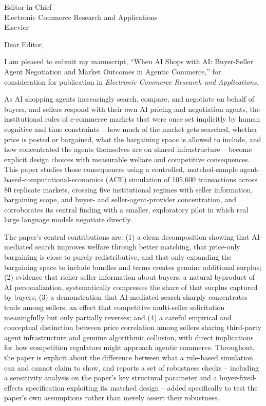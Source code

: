 \documentclass[12pt]{letter}
\begin{document}
\begin{letter}{Editor-in-Chief \\ Electronic Commerce Research and Applications \\ Elsevier}

\opening{Dear Editor,}

I am pleased to submit my manuscript, ``When AI Shops with AI: Buyer-Seller Agent Negotiation and Market Outcomes in Agentic Commerce,'' for consideration for publication in \emph{Electronic Commerce Research and Applications}.

As AI shopping agents increasingly search, compare, and negotiate on behalf of buyers, and sellers respond with their own AI pricing and negotiation agents, the institutional rules of e-commerce markets that were once set implicitly by human cognitive and time constraints -- how much of the market gets searched, whether price is posted or bargained, what the bargaining space is allowed to include, and how concentrated the agents themselves are on shared infrastructure -- become explicit design choices with measurable welfare and competitive consequences. This paper studies those consequences using a controlled, matched-sample agent-based-computational-economics (ACE) simulation of 105,600 transactions across 80 replicate markets, crossing five institutional regimes with seller information, bargaining scope, and buyer- and seller-agent-provider concentration, and corroborates its central finding with a smaller, exploratory pilot in which real large language models negotiate directly.

The paper's central contributions are: (1) a clean decomposition showing that AI-mediated search improves welfare through better matching, that price-only bargaining is close to purely redistributive, and that only expanding the bargaining space to include bundles and terms creates genuine additional surplus; (2) evidence that richer seller information about buyers, a natural byproduct of AI personalization, systematically compresses the share of that surplus captured by buyers; (3) a demonstration that AI-mediated search sharply concentrates trade among sellers, an effect that competitive multi-seller solicitation meaningfully but only partially reverses; and (4) a careful empirical and conceptual distinction between price correlation among sellers sharing third-party agent infrastructure and genuine algorithmic collusion, with direct implications for how competition regulators might approach agentic commerce. Throughout, the paper is explicit about the difference between what a rule-based simulation can and cannot claim to show, and reports a set of robustness checks -- including a sensitivity analysis on the paper's key structural parameter and a buyer-fixed-effects specification exploiting its matched design -- added specifically to test the paper's own assumptions rather than merely assert their robustness.


\end{letter}
\end{document}
